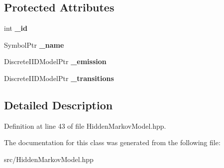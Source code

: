 \subsection*{Protected Attributes}
\begin{DoxyCompactItemize}
\item 
\mbox{\label{classtops_1_1HMMState_a13df0240086c370c94644b6c70fb6ec9}} 
int {\bfseries \+\_\+id}
\item 
\mbox{\label{classtops_1_1HMMState_a8be26ba55501115c20d1f5c0203f9f4c}} 
Symbol\+Ptr {\bfseries \+\_\+name}
\item 
\mbox{\label{classtops_1_1HMMState_a2d535c781d8f704f3c4e68b997f76b3b}} 
Discrete\+I\+I\+D\+Model\+Ptr {\bfseries \+\_\+emission}
\item 
\mbox{\label{classtops_1_1HMMState_a1c3d543fc150856d98e910ecc1363215}} 
Discrete\+I\+I\+D\+Model\+Ptr {\bfseries \+\_\+transitions}
\end{DoxyCompactItemize}


\subsection{Detailed Description}


Definition at line 43 of file Hidden\+Markov\+Model.\+hpp.



The documentation for this class was generated from the following file\+:\begin{DoxyCompactItemize}
\item 
src/Hidden\+Markov\+Model.\+hpp\end{DoxyCompactItemize}
